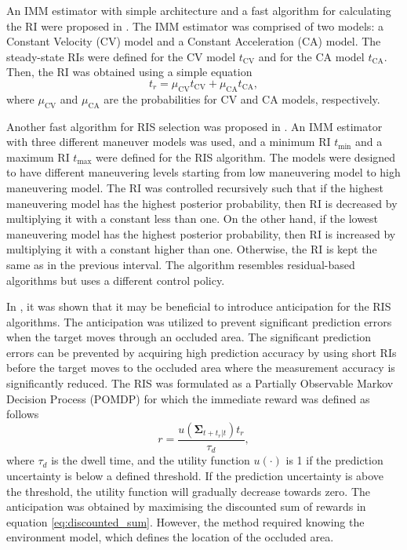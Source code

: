 \documentclass[english, 12pt, a4paper, elec, utf8, a-1b, online]{aaltothesis}
\numberwithin{equation}{section}
\renewcommand{\vec}[1]{\mathbf{#1}}
\newcommand{\tmax}{t_\text{max}}
\newcommand{\tmin}{t_\text{min}}
\newcommand{\muca}{\mu_{\text{CA}}}
\newcommand{\mucv}{\mu_{\text{CV}}}
\newcommand{\ri}{t_r}
\begin{document}
 An IMM estimator with simple architecture and a fast algorithm for calculating the RI were proposed in \cite{Benoudnine2006}.
The IMM estimator was comprised of two models: a Constant Velocity (CV) model and a Constant Acceleration (CA) model.
The steady-state RIs were defined for the CV model $t_\text{CV}$ and for the CA model $t_\text{CA}$.
Then, the RI was obtained using a simple equation
\begin{equation}\label{eq:fimm}
    \ri = \mucv t_\text{CV} + \muca t_\text{CA},
\end{equation}
where $\mucv$ and $\muca$ are the probabilities for CV and CA models, respectively.

Another fast algorithm for RIS selection was proposed in \cite{MasoumiGanjgah2017}.
An IMM estimator with three different maneuver models was used, and a minimum RI $\tmin$ and a maximum RI $\tmax$ were defined for the RIS algorithm.
The models were designed to have different maneuvering levels starting from low maneuvering model to high maneuvering model.
The RI was controlled recursively such that if the highest maneuvering model has the highest posterior probability, then RI is decreased by multiplying it with a constant less than one.
On the other hand, if the lowest maneuvering model has the highest posterior probability, then RI is increased by multiplying it with a constant higher than one.
Otherwise, the RI is kept the same as in the previous interval.
The algorithm resembles residual-based algorithms but uses a different control policy.

In \cite{Charlish2015}, it was shown that it may be beneficial to introduce anticipation for the RIS algorithms.
The anticipation was utilized to prevent significant prediction errors when the target moves through an occluded area.
The significant prediction errors can be prevented by acquiring high prediction accuracy by using short RIs before the target moves to the occluded area where the measurement accuracy is significantly reduced.
The RIS was formulated as a Partially Observable Markov Decision Process (POMDP) for which the immediate reward was defined as follows
\begin{equation}
    r = \frac{u\left(\vec{\Sigma}_{t+\ri|t} \right) \ri}{\tau_d},
\end{equation}
where $\tau_d$ is the dwell time, and the utility function $u(\cdot)$ is 1 if the prediction uncertainty is below a defined threshold.
If the prediction uncertainty is above the threshold, the utility function will gradually decrease towards zero.
The anticipation was obtained by maximising the discounted sum of rewards in equation \eqref{eq:discounted_sum}.
However, the method required knowing the environment model, which defines the location of the occluded area.
\end{document}
